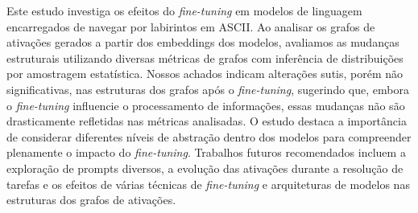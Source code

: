 \begin{abstract}
  This study investigates the effects of \textit{fine-tuning} on language models tasked with navigating ASCII mazes. By analyzing activation graphs generated from model embeddings, we assess structural changes using various graph metrics with distribution inference through statistical sampling. Our findings indicate subtle yet non-significant alterations in graph structures post-\textit{fine-tuning}, suggesting that while \textit{fine-tuning} influences information processing, these changes are not drastically reflected in the analyzed metrics. The study highlights the importance of considering different abstraction levels within models to fully understand the impact of \textit{fine-tuning}. Future recommended works include exploring diverse prompts, activation evolution during task resolution, and the effects of various \textit{fine-tuning} techniques and model architectures on activation graph structures.
\end{abstract}

\begin{resumo} 
  Este estudo investiga os efeitos do \textit{fine-tuning} em modelos de linguagem encarregados de navegar por labirintos em ASCII. Ao analisar os grafos de ativações gerados a partir dos embeddings dos modelos, avaliamos as mudanças estruturais utilizando diversas métricas de grafos com inferência de distribuições por amostragem estatística. Nossos achados indicam alterações sutis, porém não significativas, nas estruturas dos grafos após o \textit{fine-tuning}, sugerindo que, embora o \textit{fine-tuning} influencie o processamento de informações, essas mudanças não são drasticamente refletidas nas métricas analisadas. O estudo destaca a importância de considerar diferentes níveis de abstração dentro dos modelos para compreender plenamente o impacto do \textit{fine-tuning}. Trabalhos futuros recomendados incluem a exploração de prompts diversos, a evolução das ativações durante a resolução de tarefas e os efeitos de várias técnicas de \textit{fine-tuning} e arquiteturas de modelos nas estruturas dos grafos de ativações.  
\end{resumo}